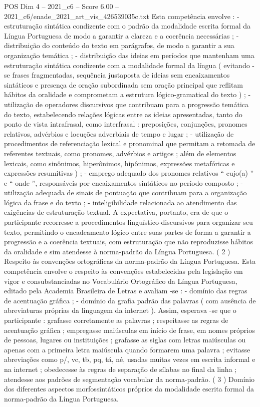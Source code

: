 \begin{textsample}{POS Dim 4 – 2021\_c6 – Score 6.00 – 2021\_c6/enade\_2021\_art\_vis\_426539035c.txt}
Esta competência envolve : - estruturação sintática condizente com o padrão da modalidade escrita formal da Língua Portuguesa de modo a garantir a clareza e a coerência necessárias ; - distribuição do conteúdo do texto em parágrafos, de modo a garantir a sua organização temática ; - distribuição das ideias em períodos que mantenham uma estruturação sintática condizente com a modalidade formal da língua ( evitando -se frases fragmentadas, sequência justaposta de ideias sem encaixamentos sintáticos e presença de oração subordinada sem oração principal que reflitam hábitos da oralidade e comprometam a estrutura lógico-gramatical do texto ) ; - utilização de operadores discursivos que contribuam para a progressão temática do texto, estabelecendo relações lógicas entre as ideias apresentadas, tanto do ponto de vista intrafrasal, como interfrasal : preposições, conjunções, pronomes relativos, advérbios e locuções adverbiais de tempo e lugar ; - utilização de procedimentos de referenciação lexical e pronominal que permitam a retomada de referentes textuais, como pronomes, advérbios e artigos ; além de elementos lexicais, como sinônimos, hiperônimos, hipônimos, expressões metafóricas e expressões resumitivas ) ; - emprego adequado dos pronomes relativos “ cujo(a) ” e “ onde ”, responsáveis por encaixamentos sintáticos no período composto ; - utilização adequada de sinais de pontuação que contribuam para a organização lógica da frase e do texto ; - inteligibilidade relacionada ao atendimento das exigências de estruturação textual.
A expectativa, portanto, era de que o participante recorresse a procedimentos linguístico-discursivos para organizar seu texto, permitindo o encadeamento lógico entre suas partes de forma a garantir a progressão e a coerência textuais, com estruturação que não reproduzisse hábitos da oralidade e sim atendesse à norma-padrão da Língua Portuguesa. ( 2 ) Respeito às convenções ortográficas da norma-padrão da Língua Portuguesa.
Esta competência envolve o respeito às convenções estabelecidas pela legislação em vigor e consubstanciadas no Vocabulário Ortográfico da Língua Portuguesa, editado pela Academia Brasileira de Letras e avaliam -se : - domínio das regras de acentuação gráfica ; - domínio da grafia padrão das palavras ( com ausência de abreviaturas próprias da linguagem da internet ).
Assim, esperava -se que o participante : grafasse corretamente as palavras ; respeitasse as regras de acentuação gráfica ; empregasse maiúsculas em início de frase, em nomes próprios de pessoas, lugares ou instituições ; grafasse as siglas com letras maiúsculas ou apenas com a primeira letra maiúscula quando formarem uma palavra ; evitasse abreviações como p/, vc, tb, pq, tá, né, usadas muitas vezes em escrita informal e na internet ; obedecesse às regras de separação de sílabas no final da linha ; atendesse aos padrões de segmentação vocabular da norma-padrão. ( 3 ) Domínio dos diferentes aspectos morfossintáticos próprios da modalidade escrita formal da norma-padrão da Língua Portuguesa.

\end{textsample}
